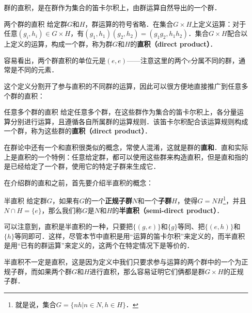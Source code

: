 
群的直积，是在群作为集合的笛卡尔积上，由群运算自然导出的一个群．

\begin{definition}{两个群的直积}
给定群$G$和$H$，群运算的符号省略．在集合$G\times H$上定义运算：对于任意$(g_i, h_i)\in G\times H$，有$(g_1, h_1)(g_2, h_2)=(g_1g_2, h_1h_2)$．集合$G\times H$配合以上定义的运算，构成一个群，称为群$G$和$H$的\textbf{直积（direct product）}．
\end{definition}

容易看出，两个群直积的单位元是$(e, e)$——注意这里的两个$e$分属不同的群，通常是不同的元素．

这个定义分割开了参与直积的不同群的运算，因此可以很方便地直接推广到任意多个群的直积：

\begin{definition}{任意多个群的直积}
给定任意多个群，在这些群作为集合的笛卡尔积上，各分量运算分别进行运算，且遵循各自所属群的运算规则．该笛卡尔积配合该运算规则构成一个群，称为这些群的\textbf{直积（direct product）}．
\end{definition}

在群论中还有一个和直积很类似的概念，常使人混淆，这就是群的\textbf{直和}．直和实际上是直积的一个特例：任意给定群，都可以使用这些群来构造直积，但是直和指的是已经给定了一个群，使用它的特定子群来生成它．

在介绍群的直和之前，首先要介绍半直积的概念：

\begin{definition}{半直积}
给定群$G$，如果有$G$的一个\textbf{正规子群}$N$和一个\textbf{子群}$H$，使得$G=NH$\footnote{就是说，集合$G=\{nh|n\in N, h\in H\}$．}，并且$N\cap H=\{e\}$，那么我们称$G$是$N$和$H$的\textbf{半直积（semi-direct product）}．
\end{definition}

可以注意到，直积是半直积的一种，只要把$\{(g, e)\}$和$\{g\}$等同、把$\{(e, h)\}$和$\{h\}$等同即可．这样，尽管本节中直积是用“运算的笛卡尔积”来定义的，而半直积是用“已有的群运算”来定义的，这两个在特定情况下是等价的．

半直积不一定是直积，这是因为定义中我们只要求参与运算的两个群中的一个为正规子群，而如果两个群$G$和$H$进行直积，那么容易证明它们俩都是群$G\times H$的正规子群．











